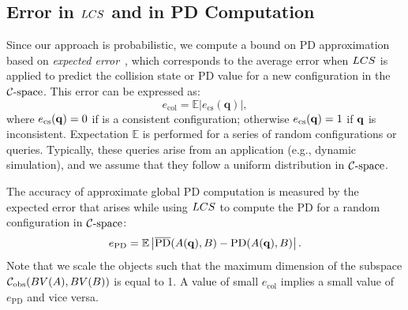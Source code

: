 \subsection{Error in $LCS$ and in PD Computation}
\label{sec:errordefine}
Since our approach is probabilistic, we compute a bound on PD approximation based on \emph{expected
error}~\cite{Vapnik:1995:NSL}, which corresponds to the average error
when $LCS$ is applied to predict the
collision state or PD value for a new configuration in the $\mathcal C\text{-space}$.
This error can be expressed as:
\begin{equation}
\label{eq:2:Errdef0} e_{\text{col}} = \mathbb E
\left|e_\text{cs}(\mathbf q) \right|,
\end{equation}
where $e_{\text{cs}}(\mathbf q)=0$ if \q is a consistent configuration; otherwise $e_{\text{cs}}(\mathbf q)=1$ if $\mathbf q$ is inconsistent.
Expectation $\mathbb E$ is performed for a series of
random configurations or queries. Typically, these queries arise from an application (e.g., dynamic simulation), and
we assume that they follow a uniform distribution in $\mathcal C\text{-space}$.

The accuracy of approximate global PD computation is measured by the expected error that arises
while using $LCS$ to compute the PD for a random configuration in $\mathcal C\text{-space}$:
\begin{equation}
\label{eq:2:Errdef} e_{\text{PD}} = \mathbb E
\left|\overline{\text{PD}}(A(\mathbf q), B) - \text{PD}(A(\mathbf q), B)\right|.
\end{equation}
Note that we scale the objects such that the maximum dimension of the subspace $\mathcal C_{\text{obs}} (BV(A),BV(B))$ is equal to 1.
A value of small $e_{\text{col}}$ implies a small value of $e_{\text{PD}}$ and vice versa.

